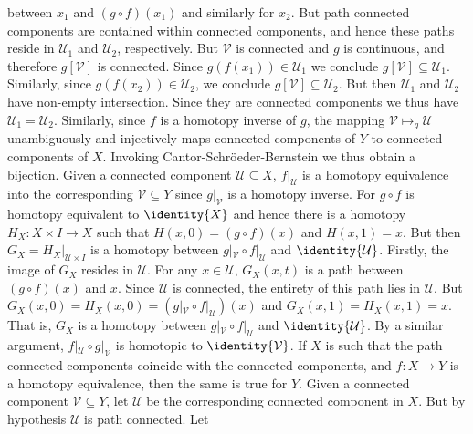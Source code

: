 \begin{solution}
        between $x_{1}$ and $(g\circ{f})(x_{1})$ and similarly for $x_{2}$. But
        path connected components are contained within connected components, and
        hence these paths reside in $\mathcal{U}_{1}$ and $\mathcal{U}_{2}$,
        respectively. But $\mathcal{V}$ is connected and $g$ is continuous, and
        therefore $g[\mathcal{V}]$ is connected. Since
        $g(f(x_{1}))\in\mathcal{U}_{1}$ we conclude
        $g[\mathcal{V}]\subseteq\mathcal{U}_{1}$. Similarly, since
        $g(f(x_{2}))\in\mathcal{U}_{2}$, we conclude
        $g[\mathcal{V}]\subseteq\mathcal{U}_{2}$. But then $\mathcal{U}_{1}$ and
        $\mathcal{U}_{2}$ have non-empty intersection. Since they are connected
        components we thus have $\mathcal{U}_{1}=\mathcal{U}_{2}$. Similarly,
        since $f$ is a homotopy inverse of $g$, the mapping
        $\mathcal{V}\mapsto_{g}\mathcal{U}$ unambiguously and injectively maps 
        connected components of $Y$ to connected components of $X$. Invoking
        Cantor-Schr\"{o}eder-Bernstein we thus obtain a bijection. Given
        a connected component $\mathcal{U}\subseteq{X}$, $f|_{\mathcal{U}}$ is a
        homotopy equivalence into the corresponding $\mathcal{V}\subseteq{Y}$
        since $g|_{\mathcal{V}}$ is a homotopy inverse. For $g\circ{f}$ is
        homotopy equivalent to $\identity{X}$ and hence there is a homotopy
        $H_{X}:X\times{I}\rightarrow{X}$ such that
        $H(x,0)=(g\circ{f})(x)$ and $H(x,1)=x$. But then
        $G_{X}=H_{X}|_{\mathcal{U}\times{I}}$ is a homotopy between
        $g|_{\mathcal{V}}\circ{f}|_{\mathcal{U}}$ and $\identity{\mathcal{U}}$.
        Firstly, the image of $G_{X}$ resides in $\mathcal{U}$. For any
        $x\in\mathcal{U}$, $G_{X}(x,t)$ is a path between
        $(g\circ{f})(x)$ and $x$. Since $\mathcal{U}$ is connected, the entirety
        of this path lies in $\mathcal{U}$. But
        $G_{X}(x,0)=H_{X}(x,0)=(g|_{\mathcal{V}}\circ{f}|_{\mathcal{U}})(x)$
        and $G_{X}(x,1)=H_{X}(x,1)=x$. That is, $G_{X}$ is a homotopy between
        $g|_{\mathcal{V}}\circ{f}|_{\mathcal{U}}$ and $\identity{\mathcal{U}}$.
        By a similar argument, $f|_{\mathcal{U}}\circ{g}|_{\mathcal{V}}$ is
        homotopic to $\identity{\mathcal{V}}$. If $X$ is such that the path
        connected components coincide with the connected components, and
        $f:X\rightarrow{Y}$ is a homotopy equivalence, then the same is true for
        $Y$. Given a connected component $\mathcal{V}\subseteq{Y}$, let
        $\mathcal{U}$ be the corresponding connected component in $X$. But by
        hypothesis $\mathcal{U}$ is path connected. Let

\end{solution}
